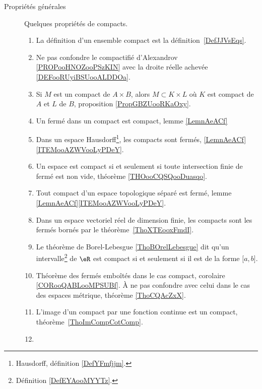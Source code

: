 
        \label{THEMEooQQBHooLcqoKB}
\begin{description}

	\item[Propriétés générales]

	      Quelques propriétés de compacts.

	      \begin{enumerate}
		      \item
		            La définition d'un ensemble compact est la définition~\ref{DefJJVsEqs}.
		      \item
		            Ne pas confondre le compactifié d'Alexandrov \ref{PROPooHNOZooPSzKIN} avec la droite réelle achevée \ref{DEFooRUyiBSUooALDDOa}.
		      \item
		            Si \( M\) est un compact de \( A\times B\), alors \( M\subset K\times L\) où \( K\) est compact de \( A\) et \( L\) de \( B\), proposition \ref{PropGBZUooRKaOxy}.
		      \item
		            Un fermé dans un compact est compact, lemme \ref{LemnAeACf}
		      \item
		            Dans un espace Hausdorff\footnote{Hausdorff, définition \ref{DefYFmfjjm}.}, les compacts sont fermés, \ref{LemnAeACf}\ref{ITEMooAZWVooLyPDeY}.
		      \item
		            Un espace est compact si et seulement si toute intersection finie de fermé est non vide, théorème \ref{THOooCQSQooDuasqo}.
		      \item
		            Tout compact d'un espace topologique séparé est fermé, lemme \ref{LemnAeACf}\ref{ITEMooAZWVooLyPDeY}.
		      \item
		            Dans un espace vectoriel réel de dimension finie, les compacts sont les fermés bornés par le théorème~\ref{ThoXTEooxFmdI}.
		      \item
		            Le théorème de Borel-Lebesgue \ref{ThoBOrelLebesgue} dit qu'un intervalle\footnote{Définition \ref{DefEYAooMYYTz}.} de \( \eR\) est compact si et seulement si il est de la forme \( \mathopen[ a , b \mathclose]\).
		      \item
		            Théorème des fermés emboîtés dans le cas compact, corolaire \ref{CORooQABLooMPSUBf}. À ne pas confondre avec celui dans le cas des espaces métrique, théorème \ref{ThoCQAcZxX}.
		      \item
		            L'image d'un compact par une fonction continue est un compact, théorème~\ref{ThoImCompCotComp}.
                \item

\end{enumerate}
\end{description}
